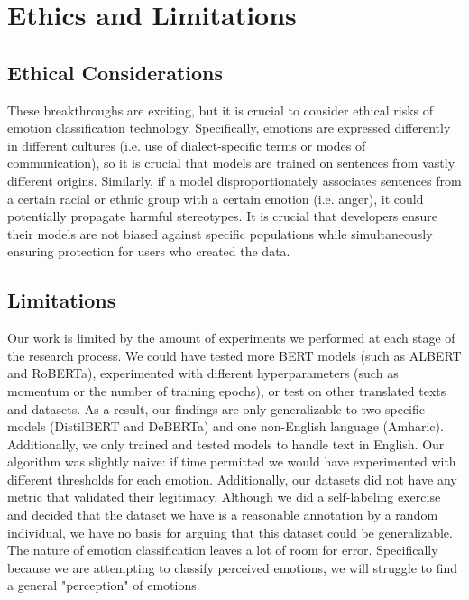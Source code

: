 \documentclass[11pt]{article}
\begin{document}
\section{Ethics and Limitations}

\subsection{Ethical Considerations}

These breakthroughs are exciting, but it is crucial to consider ethical risks of emotion classification technology. Specifically, emotions are expressed differently in different cultures (i.e. use of dialect-specific terms or modes of communication), so it is crucial that models are trained on sentences from vastly different origins. Similarly, if a model disproportionately associates sentences from a certain racial or ethnic group with a certain emotion (i.e. anger), it could potentially propagate harmful stereotypes. It is crucial that developers ensure their models are not biased against specific populations while simultaneously ensuring protection for users who created the data.

\subsection{Limitations}

Our work is limited by the amount of experiments we performed at each stage of the research process. We could have tested more BERT models (such as ALBERT and RoBERTa), experimented with different hyperparameters (such as momentum or the number of training epochs), or test on other translated texts and datasets. As a result, our findings are only generalizable to two specific models (DistilBERT and DeBERTa) and one non-English language (Amharic). Additionally, we only trained and tested models to handle text in English. Our algorithm was slightly naive: if time permitted we would have experimented with different thresholds for each emotion. Additionally, our datasets did not have any metric that validated their legitimacy. Although we did a self-labeling exercise and decided that the dataset we have is a reasonable annotation by a random individual, we have no basis for arguing that this dataset could be generalizable. The nature of emotion classification leaves a lot of room for error. Specifically because we are attempting to classify perceived emotions, we will struggle to find a general "perception" of emotions.
\end{document}
